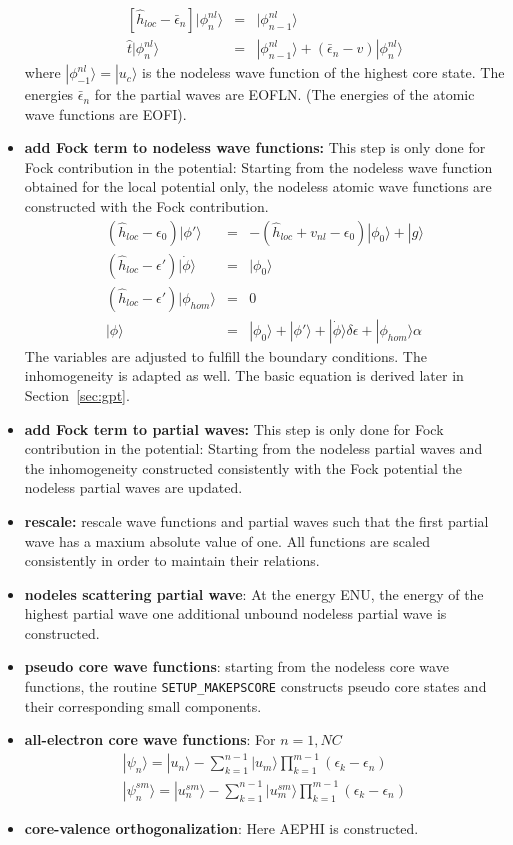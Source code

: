 \documentclass[11pt,a4paper]{report}
\begin{document}
\begin{itemize}
\begin{eqnarray*}
\left[\hat{h}_{loc}-\bar{\epsilon}_n\right]|\phi^{nl}_{n}\rangle&=&
|\phi^{nl}_{n-1}\rangle
\\
\hat{t}|\phi^{nl}_n\rangle
&=&|\phi^{nl}_{n-1}\rangle+(\bar{\epsilon}_n-v)|\phi^{nl}_n\rangle
\end{eqnarray*}
where $|\phi^{nl}_{-1}\rangle=|u_c\rangle$ is the nodeless wave
function of the highest core state. The energies $\bar{\epsilon}_n$
for the partial waves are EOFLN. (The energies of the atomic wave
functions are EOFI).
%
\item \textbf{add Fock term to nodeless wave functions:} This step is
  only done for Fock contribution in the potential: Starting from the
  nodeless wave function obtained for the local potential only, the
  nodeless atomic wave functions are constructed with the Fock
  contribution.
  \begin{eqnarray*}
  \left(\hat{h}_{loc}-\epsilon_0\right)|\phi'\rangle&=&
  -\left(\hat{h}_{loc}+v_{nl}-\epsilon_0\right)|\phi_0\rangle+|g\rangle
\\
  \left(\hat{h}_{loc}-\epsilon'\right)|\dot{\phi}\rangle&=&|\phi_0\rangle
\\
  \left(\hat{h}_{loc}-\epsilon'\right)|\phi_{hom}\rangle&=&0
\\
|\phi\rangle&=&|\phi_0\rangle+|\phi'\rangle
+|\dot{\phi}\rangle\delta\epsilon+|\phi_{hom}\rangle\alpha
  \end{eqnarray*}
  The variables are adjusted to fulfill the boundary conditions.  The
  inhomogeneity is adapted as well.  The basic equation is derived
  later in Section~\ref{sec:gpt}.
%
\item \textbf{add Fock term to partial waves:} This step is only done
  for Fock contribution in the potential: Starting from the nodeless
  partial waves and the inhomogeneity constructed consistently with
  the Fock potential the nodeless partial waves are updated.
%
\item \textbf{rescale:} rescale wave functions and partial waves such
  that the first partial wave has a maxium absolute value of one. All
  functions are scaled consistently in order to maintain their
  relations.
%
\item \textbf{nodeles scattering partial wave}: At the energy ENU, the
  energy of the highest partial wave one additional unbound nodeless
  partial wave is constructed.
%
\item \textbf{pseudo core wave functions}: starting from the nodeless
  core wave functions, the routine \verb|SETUP_MAKEPSCORE| constructs
  pseudo core states and their corresponding small components.
%
\item \textbf{all-electron core wave functions}: For $n=1,NC$
\begin{eqnarray}
|\psi_n\rangle=|u_n\rangle
-\sum_{k=1}^{n-1}|u_m\rangle\prod_{k=1}^{m-1}(\epsilon_k-\epsilon_n)
\nonumber\\
|\psi_n^{sm}\rangle=|u^{sm}_n\rangle
-\sum_{k=1}^{n-1}|u^{sm}_m\rangle\prod_{k=1}^{m-1}(\epsilon_k-\epsilon_n)
\end{eqnarray}
%
\item \textbf{core-valence orthogonalization}: Here AEPHI is constructed.


\end{itemize}
\end{document}
